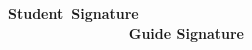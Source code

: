 \documentclass[12pt]{article}
\begin{document}

 \par

 \par


\vspace{\baselineskip}

\vspace{\baselineskip}
{\fontsize{14pt}{16.8pt}\selectfont \textbf{Student\ Signature\ \ \ \ \ \ \ \ \ \ \ \ \ \ \ \ \ \ \ \ \ \ \ \ \ \ \ \ \ \ \ \ \ \ \ \ \ \ \ \ \ \ \ \ \ \ \ \ \ \ \ \ \ \ \ \ \ \ \ \ \   Guide Signature}\par}\par

\begin{justify}
 
\end{justify}\par


\vspace{\baselineskip}

\printbibliography
\end{document}
